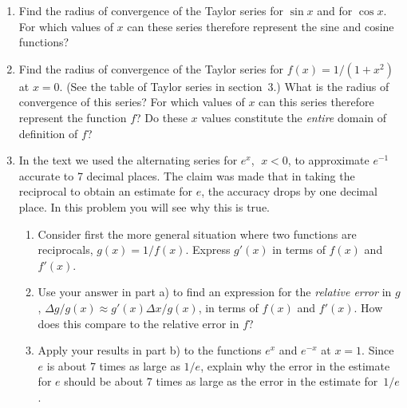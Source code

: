 \begin{enumerate}
\begin{enumerate}
  \item ${\displaystyle \sum_{n = 0}^{\infty} (n+5)^2\, x^n}$. \hfill
     [Answer: $R = 1$]


  \item ${\displaystyle \sum_{n = 0}^{\infty}
\dfrac{99}{n^n} x^n}$. \hfill [Answer: $R = \infty$]


  \item ${\displaystyle \sum_{n = 0}^{\infty} n!\, x^n}$.
\hfill [Answer: $R = 0$]


\end{enumerate}
\item Find the radius of convergence of the Taylor series for $\sin{x}$
and for $\cos{x}$.  For which values of $x$ can these series therefore
represent the sine and cosine functions?


\item Find the radius of convergence of the Taylor series for $f(x) =
1/(1 + x^2)$ at $x = 0$.  (See the table of Taylor series in section~3.)
What is the radius of convergence of this series?  For which values of
$x$ can this series therefore represent the function $f$?  Do these
$x$ values constitute the {\em entire\/} domain of definition of $f$?


\item In the text we used the alternating series for $e^x$, $\; x < 0$,
to approximate $e^{-1}$ accurate to 7 decimal places.  The claim was
made that in taking the reciprocal to obtain an estimate for $e$, the
accuracy drops by one decimal place.  In this problem you will see why
this is true.

  \begin{enumerate}
  \item Consider first the more general situation where two functions are
reciprocals, $g(x) = 1/f(x)$.  Express $g'(x)$ in terms of $f(x)$ and
$f'(x)$.

  \item Use your answer in part a) to find an expression for the {\em
  relative error} in $g$, $\Delta g/g(x) \approx g'(x) \Delta x/g(x)$,
in terms of $f(x)$ and $f'(x)$.  How does this compare to the relative
error in $f$?

  \item Apply your results in part b) to the functions $e^x$ and $e^{-x}$
at $x=1$.  Since $e$ is about 7 times as large as $1/e$, explain why
the error in the estimate for $e$ should be about 7 times as large as
the error in the estimate for~$1/e$.





\end{enumerate}
\end{enumerate}
